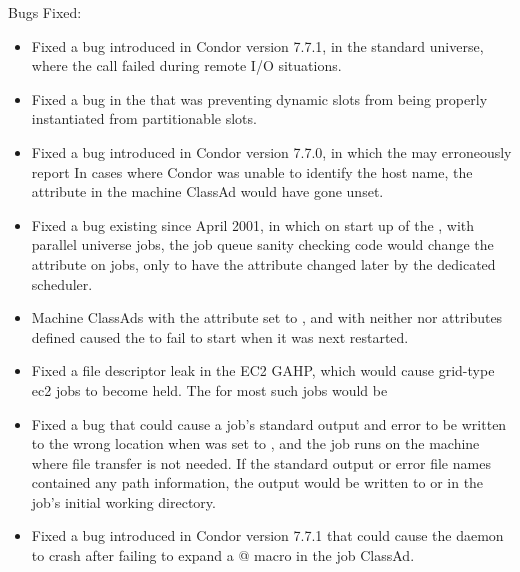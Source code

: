 \noindent Bugs Fixed:

\begin{itemize}

\item Fixed a bug introduced in Condor version 7.7.1, 
in the standard universe,
where the  call failed during remote I/O situations.

\item Fixed a bug in the  that was preventing dynamic slots
from being properly instantiated from partitionable slots.

\item Fixed a bug introduced in Condor version 7.7.0, 
in which the  may erroneously report 
In cases where Condor was unable to identify the host name, 
the 
attribute in the machine ClassAd would have gone unset.

\item Fixed a bug existing since April 2001,
in which on start up of the , with parallel universe jobs, 
the job queue sanity checking code would change the 
attribute on jobs,
only to have the attribute changed later by the dedicated scheduler.

\item Machine ClassAds with the  attribute set to ,
and  with neither  nor  
attributes defined caused
the  to fail to start when it was next restarted.

\item Fixed a file descriptor leak in the EC2 GAHP,
which would cause grid-type ec2 jobs to become held. 
The  for most such jobs would be 

\item Fixed a bug that could cause a job's standard output and error to
be written to the wrong location when  was
set to ,
and the job runs on the machine where file transfer is not needed.
If the standard output or error file names contained any path information,
the output would be written to  or
 in the job's initial working directory.

\item Fixed a bug introduced in Condor version 7.7.1
that could cause the  daemon to crash after
failing to expand a \verb@$$@ macro in the job ClassAd.

\end{itemize}

